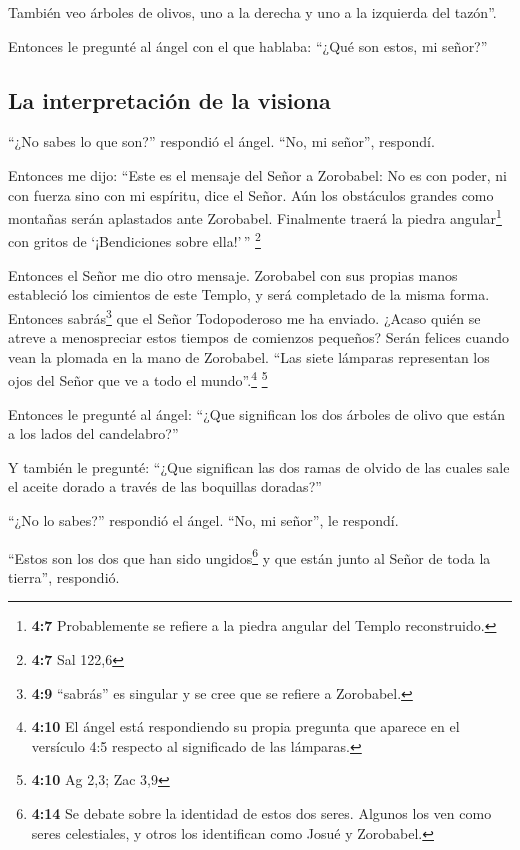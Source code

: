  También veo árboles de olivos, uno a la derecha y uno a
la izquierda del tazón''.

 Entonces le pregunté al ángel con el que hablaba: ``¿Qué
son estos, mi señor?''

\hypertarget{la-interpretaciuxf3n-de-la-visiona}{%
\subsection{La interpretación de la
visiona}\label{la-interpretaciuxf3n-de-la-visiona}}

 ``¿No sabes lo que son?'' respondió el ángel. ``No, mi
señor'', respondí.

 Entonces me dijo: ``Este es el mensaje del Señor a
Zorobabel: No es con poder, ni con fuerza sino con mi espíritu, dice el
Señor.  Aún los obstáculos grandes como montañas serán
aplastados ante Zorobabel. Finalmente traerá la piedra
angular\footnote{\textbf{4:7} Probablemente se refiere a la piedra
  angular del Templo reconstruido.} con gritos de `¡Bendiciones sobre
ella!'\,'' \footnote{\textbf{4:7} Sal 122,6}

 Entonces el Señor me dio otro mensaje. 
Zorobabel con sus propias manos estableció los cimientos de este Templo,
y será completado de la misma forma. Entonces sabrás\footnote{\textbf{4:9}
  ``sabrás'' es singular y se cree que se refiere a Zorobabel.} que el
Señor Todopoderoso me ha enviado.  ¿Acaso quién se atreve
a menospreciar estos tiempos de comienzos pequeños? Serán felices cuando
vean la plomada en la mano de Zorobabel. ``Las siete lámparas
representan los ojos del Señor que ve a todo el mundo''.\footnote{\textbf{4:10}
  El ángel está respondiendo su propia pregunta que aparece en el
  versículo 4:5 respecto al significado de las lámparas.} \footnote{\textbf{4:10}
  Ag 2,3; Zac 3,9}

 Entonces le pregunté al ángel: ``¿Que significan los dos
árboles de olivo que están a los lados del candelabro?''

 Y también le pregunté: ``¿Que significan las dos ramas
de olvido de las cuales sale el aceite dorado a través de las boquillas
doradas?''

 ``¿No lo sabes?'' respondió el ángel. ``No, mi señor'',
le respondí.

 ``Estos son los dos que han sido ungidos\footnote{\textbf{4:14}
  Se debate sobre la identidad de estos dos seres. Algunos los ven como
  seres celestiales, y otros los identifican como Josué y Zorobabel.} y
que están junto al Señor de toda la tierra'', respondió.

